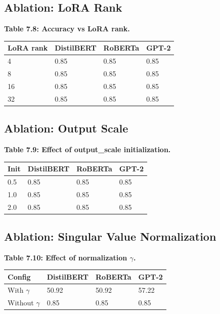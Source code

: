 \subsection{Ablation: LoRA Rank}

\textbf{Table 7.8: Accuracy vs LoRA rank.}

\begin{table}[H]
\centering
\small
\begin{tabular}{llll}
\toprule
\textbf{LoRA rank} & \textbf{DistilBERT} & \textbf{RoBERTa} & \textbf{GPT-2} \\
\midrule
4 & 0.85 & 0.85 & 0.85 \\
8 & 0.85 & 0.85 & 0.85 \\
16 & 0.85 & 0.85 & 0.85 \\
32 & 0.85 & 0.85 & 0.85 \\
\bottomrule
\end{tabular}
\end{table}

\subsection{Ablation: Output Scale}

\textbf{Table 7.9: Effect of output\_scale initialization.}

\begin{table}[H]
\centering
\small
\begin{tabular}{llll}
\toprule
\textbf{Init} & \textbf{DistilBERT} & \textbf{RoBERTa} & \textbf{GPT-2} \\
\midrule
0.5 & 0.85 & 0.85 & 0.85 \\
1.0 & 0.85 & 0.85 & 0.85 \\
2.0 & 0.85 & 0.85 & 0.85 \\
\bottomrule
\end{tabular}
\end{table}

\subsection{Ablation: Singular Value Normalization}

\textbf{Table 7.10: Effect of normalization $\gamma$.}

\begin{table}[H]
\centering
\small
\begin{tabular}{llll}
\toprule
\textbf{Config} & \textbf{DistilBERT} & \textbf{RoBERTa} & \textbf{GPT-2} \\
\midrule
With $\gamma$ & 50.92 & 50.92 & 57.22 \\
Without $\gamma$ & 0.85 & 0.85 & 0.85 \\
\bottomrule
\end{tabular}
\end{table}

